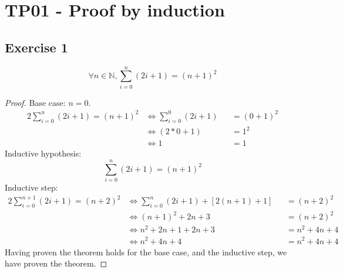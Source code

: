 \documentclass[docid=TP01]{tcom_TP}
\begin{document}
\setcounter{section}{0}
\section{TP01 - Proof by induction}
\subsection{Exercise 1}
\begin{theorem}
	\begin{equation*}
		\forall n\in\mathbb{N},\sum_{i=0}^{n}{(2i+1)}=(n+1)^2
	\end{equation*}
\end{theorem}
\begin{proof}
	Base case: $n=0$.
\begin{alignat*}{2}
	\sum_{i=0}^{n}{(2i+1)}=(n+1)^2
	&\iff \sum_{i=0}^{0}{(2i+1)}&&=(0+1)^2 \\
    &\iff (2*0+1)               &&=1^2 \\
    &\iff 1                     &&=1
\end{alignat*}
Inductive hypothesis:
\begin{equation*}
	\sum_{i=0}^{n}{(2i+1)}=(n+1)^2
\end{equation*}
Inductive step:
\begin{alignat*}{2}
	\sum_{i=0}^{n+1}{(2i+1)}=(n+2)^2
	&\iff \sum_{i=0}^{n}{(2i+1)}+[2(n+1)+1]&&=(n+2)^2 \\
    &\iff (n+1)^2+2n+3                     &&=(n+2)^2 \\
    &\iff n^2+2n+1+2n+3                    &&=n^2+4n+4 \\
    &\iff n^2+4n+4                         &&=n^2+4n+4
\end{alignat*}
Having proven the theorem holds for the base case, and the inductive step, we have proven the theorem.
\end{proof}
\pagebreak
\end{document}
